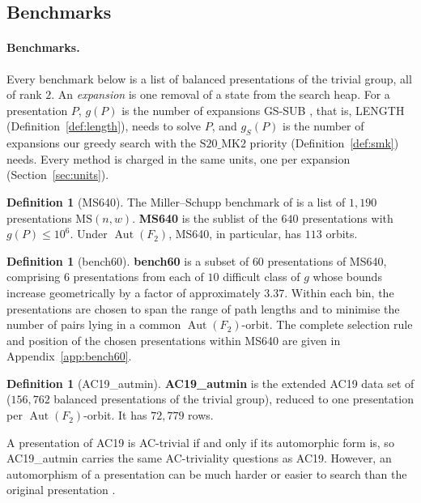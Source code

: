 \documentclass[11pt]{article}
\theoremstyle{definition}
\newtheorem{definition}[theorem]{Definition}
\theoremstyle{remark}
\newcommand{\F}{F}
\newcommand{\Aut}{\operatorname{Aut}}
\newcommand{\MS}{\mathrm{MS}}
\newcommand{\SMK}{\mathrm{S20\_MK2}}
\begin{document}
\newpage
\subsection{Benchmarks}\label{sec:benchmarks}


\paragraph{Benchmarks.} Every benchmark below is a list of balanced presentations of the trivial
group, all of rank $2$. An \emph{expansion} is one removal of a state from the search heap. For a
presentation $P$, $g(P)$ is the number of expansions GS-SUB \cite{FTS26}, that is, LENGTH
(Definition~\ref{def:length}), needs to solve $P$, and
$g_S(P)$ is the number of expansions our greedy search with the $\SMK$ priority (Definition~\ref{def:smk}) needs. Every method is charged in the same units, one per expansion (Section~\ref{sec:units}).

\begin{definition}[MS640]
The Miller--Schupp benchmark of \cite{SMM24} is a list of $1{,}190$ presentations $\MS(n,w)$. \textbf{MS640}
\cite{FTS26} is the sublist of the $640$ presentations with $g(P)\le10^6$. Under $\Aut(\F_2)$, MS640, in particular, has $113$ orbits.
\end{definition}

\begin{definition}[bench60]\label{def:bench60}
\textbf{bench60} is a subset of $60$ presentations of MS640, comprising $6$ presentations from each of $10$ difficult class of
$g$ whose bounds increase geometrically by a factor of approximately $3.37$. Within each bin, the presentations are
chosen to span the range of path lengths and to minimise the number of pairs lying in a common $\Aut(\F_2)$-orbit. The
complete selection rule and position of the chosen presentations within MS640 are given in
Appendix~\ref{app:bench60}.
\end{definition}

\begin{definition}[AC19\_autmin]\label{def:ac19}
\textbf{AC19\_autmin} is the extended AC19 data set of \cite{FTS26} ($156{,}762$ balanced
presentations of the trivial group), reduced to one presentation per $\Aut(\F_2)$-orbit.
It has $72{,}779$ rows.
\end{definition}

A presentation of AC19 is AC-trivial if and only if its automorphic form is, so AC19\_autmin
carries the same AC-triviality questions as AC19. However, an automorphism of a presentation can be much harder or easier to search than the original presentation \cite{FTS26}.
\end{document}

